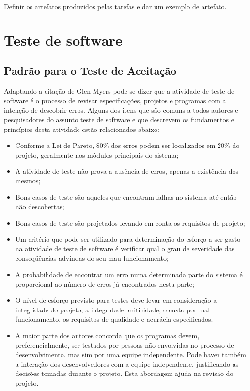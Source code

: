 Definir os artefatos produzidos pelas tarefas e dar um
exemplo de artefato.



\section{Teste de software}
\label{sec:teste}

\subsection{Padrão para o Teste de Aceitação}

Adaptando a citação de Glen Myers \cite{Myers:2004:AST:983238} pode-se dizer que a atividade de teste de software é o processo de revisar especificações, projetos e programas com a intenção de descobrir erros. Alguns dos itens que são comuns a todos autores e pesquisadores do assunto teste de software e que descrevem os fundamentos e princípios desta atividade estão relacionados abaixo:

\begin{itemize}
\item Conforme a Lei de Pareto, 80\% dos erros podem ser localizados em 20\% do projeto, geralmente nos módulos principais do sistema;

\item A atividade de teste não prova a ausência de erros, apenas a existência dos mesmos;
\item Bons casos de teste são aqueles que encontram falhas no sistema até então não descobertas;
\item Bons casos de teste são projetados levando em conta os requisitos do projeto;
\item Um critério que pode ser utilizado para determinação do esforço a ser gasto na atividade de teste de software é verificar qual o grau de severidade das conseqüências advindas do seu mau funcionamento;
\item A probabilidade de encontrar um erro numa determinada parte do sistema é proporcional ao número de erros já encontrados nesta parte;
\item O nível de esforço previsto para testes deve levar em consideração a integridade do projeto, a integridade, criticidade, o custo por mal funcionamento, os requisitos de qualidade e acurácia especificados.
\item A maior parte dos autores concorda que os programas devem, preferencialmente, ser testados por pessoas não envolvidas no processo de desenvolvimento, mas sim por uma equipe independente. Pode haver também a interação dos desenvolvedores com a equipe independente, justificando as decisões tomadas durante o projeto. Esta abordagem ajuda na revisão do projeto.

\end{itemize}

